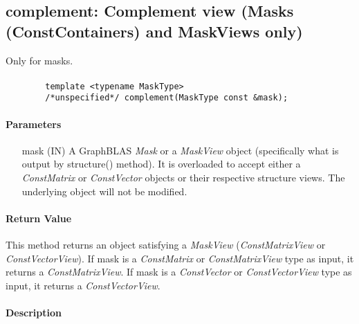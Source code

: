 \subsection{{\sf complement}: Complement view (Masks (ConstContainers) and MaskViews only)}

Only for masks.  

\paragraph{\syntax}

\begin{verbatim}
        template <typename MaskType>
        /*unspecified*/ complement(MaskType const &mask);
\end{verbatim}

\paragraph{Parameters}

\begin{itemize}%
    \item[{\sf mask}] ({\sf IN}) A GraphBLAS \emph{Mask} or a \emph{MaskView}
    object (specifically what is output by structure() method). It is 
    overloaded to accept either a \emph{ConstMatrix} or \emph{ConstVector} 
    objects or their respective structure views.  The underlying object will 
    not be modified.
\end{itemize}

\paragraph{Return Value}

This method returns an object satisfying a \emph{MaskView} (\emph{ConstMatrixView} or 
\emph{ConstVectorView}). If {\sf mask} is a \emph{ConstMatrix} or \emph{ConstMatrixView} type as input, 
it returns a \emph{ConstMatrixView}.  If {\sf mask} is a \emph{ConstVector} or  \emph{ConstVectorView}
type as input, it returns a \emph{ConstVectorView}.  

\paragraph{Description}

